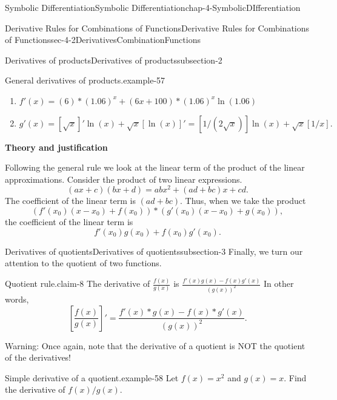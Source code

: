 \documentclass[oneside,10pt,]{book}
\newcommand{\terminology}[1]{\textbf{#1}}
\numberwithin{equation}{section}
\begin{document}
\begin{chapterptx}{Symbolic Differentiation}{}{Symbolic Differentiation}{}{}{chap-4-SymbolicDIfferentiation}
\begin{sectionptx}{Derivative Rules for Combinations of Functions}{}{Derivative Rules for Combinations of Functions}{}{}{sec-4-2DerivativesCombinationFunctions}
\begin{subsectionptx}{Derivatives of products}{}{Derivatives of products}{}{}{subsection-2}
\begin{example}{General derivatives of products.}{example-57}
\begin{enumerate}[label=(\alph*)]
\item\hypertarget{li-491}{}\(f'(x)=(6)*(1.06)^x+(6x+100)*(1.06)^x \ln(1.06)\)%
\item\hypertarget{li-492}{}\(g'(x)=[\sqrt{x}]'\ln(x)+\sqrt{x}[\ln(x)]'= [1/(2\sqrt{x})]\ln(x)+\sqrt{x}[1/x].\)%
\end{enumerate}
\end{example}
\hypertarget{p-1550}{}%
\terminology{Theory and justification}%
\par
\hypertarget{p-1551}{}%
Following the general rule we look at the linear term of the product of the linear approximations.  Consider the product of two linear expressions.%
%
\begin{equation*}
(a x+c)(b x+d)=a b x^2+(a d+b c)x+c d.
\end{equation*}
\hypertarget{p-1552}{}%
The coefficient of the linear term is \((a d+b c)\).  Thus, when we take the product%
%
\begin{equation*}
(f'(x_0)(x-x_0 )+f(x_0 ))*(g' (x_0 )(x-x_0)+g(x_0 )),
\end{equation*}
\hypertarget{p-1553}{}%
the coefficient of the linear term is%
%
\begin{equation*}
f'(x_0 )g(x_0 )+f(x_0)g'(x_0).
\end{equation*}
\end{subsectionptx}
%
%
\typeout{************************************************}
\typeout{************************************************}
%
\begin{subsectionptx}{Derivatives of quotients}{}{Derivatives of quotients}{}{}{subsection-3}
\hypertarget{p-1554}{}%
Finally, we turn our attention to the quotient of two functions.%
\begin{claim}{Quotient rule.}{}{claim-8}%
\hypertarget{p-1555}{}%
The derivative of \(\frac{f(x)}{g(x)}\) is \(\frac{f'(x)g(x)-f(x)g'(x)}{(g(x))^2}\)   In other words,%
\begin{equation*}
\left[\frac{f(x)}{g(x)}\right]'=\frac{f'(x)*g(x)-f(x)*g'(x)}{(g(x))^2}\text{.}
\end{equation*}
%
\end{claim}
\hypertarget{p-1556}{}%
Warning: Once again, note that the derivative of a quotient is NOT the quotient of the derivatives!%
\begin{example}{Simple derivative of a quotient.}{example-58}%
\hypertarget{p-1557}{}%
Let \(f(x)=x^2\) and \(g(x)=x\).  Find the derivative of \(f(x)/g(x)\).%
\par
\hypertarget{p-1558}{}%

\end{example}
\end{subsectionptx}
\end{sectionptx}
\end{chapterptx}
\end{document}
